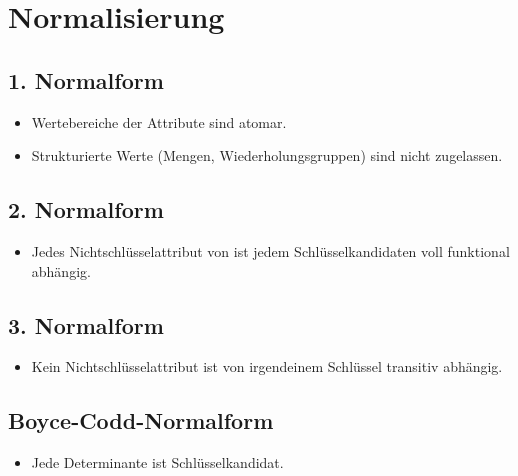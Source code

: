 \section{Normalisierung}
\subsection{1. Normalform}
\begin{itemize}
  \item Wertebereiche der Attribute sind atomar.
  \item Strukturierte Werte (Mengen, Wiederholungsgruppen) sind nicht zugelassen.
\end{itemize}

\subsection{2. Normalform}
\begin{itemize}
  \item Jedes Nichtschlüsselattribut von ist jedem Schlüsselkandidaten voll funktional abhängig.
\end{itemize}

\subsection{3. Normalform}
\begin{itemize}
  \item Kein Nichtschlüsselattribut ist von irgendeinem Schlüssel transitiv abhängig.
\end{itemize}

\subsection{Boyce-Codd-Normalform}
\begin{itemize}
  \item Jede Determinante ist Schlüsselkandidat.
\end{itemize}
